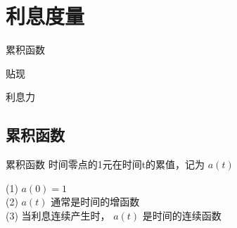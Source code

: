 \chapter{利息度量}
\begin{introduction}
	\item 累积函数
	\item 贴现
	\item 利息力
\end{introduction}
		\section{累积函数}
	\begin{definition}{累积函数}
\noindent 	时间零点的1元在时间t的累值，记为 $a(t)$
		\end{definition}
\begin{property}
  \noindent  (1) $a(0)=1$\\
(2) $a(t)$ 通常是时间的增函数\\
(3) 当利息连续产生时， $a(t)$ 是时间的连续函数
\end{property}
